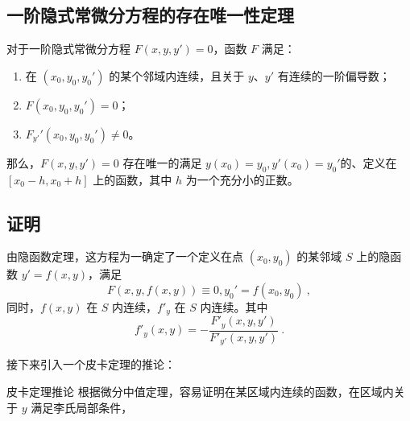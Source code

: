 
\begin{issues}
\issueDraft
\end{issues}


\subsection{一阶隐式常微分方程的存在唯一性定理}

对于一阶隐式常微分方程 $F(x, y, y')=0$，函数 $F$ 满足：
\begin{enumerate}
\item 在 $(x_0, y_0, y_0')$ 的某个邻域内连续，且关于 $y$、$y'$ 有连续的一阶偏导数；
\item $F(x_0, y_0, y_0')=0$；
\item $F_{y'}'(x_0, y_0, y_0')\neq 0$。
\end{enumerate}
那么，$F(x, y, y') = 0$ 存在唯一的满足 $y(x_0) = y_0, y'(x_0) = y_0' $的、定义在 $[x_0-h, x_0+h]$ 上的函数，其中 $h$ 为一个充分小的正数。

\subsection{证明}

由隐函数定理，这方程为一确定了一个定义在点 $(x_0, y_0)$ 的某邻域 $S$ 上的隐函数 $y'=f(x, y)$，满足
$$F(x, y, f(x,y)) \equiv 0, y_0'=f(x_0, y_0) ~,$$
同时，$f(x, y)$ 在 $S$ 内连续，$f'_y$ 在 $S$ 内连续。其中
$$f'_y(x, y) = - \frac{F'_y(x, y, y')}{F'_{y'}(x, y, y')} ~.$$

接下来引入一个皮卡定理的推论：
\begin{corollary}{皮卡定理推论}
根据微分中值定理，容易证明在某区域内连续的函数，在区域内关于 $y$ 满足李氏局部条件，
\end{corollary}